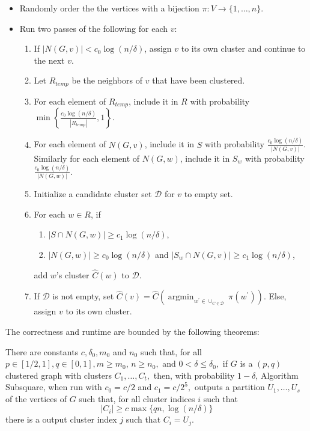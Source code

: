 {	\begin{itemize}
		\item Randomly order the the vertices with a bijection $\pi : V \rightarrow \{1, \ldots, n\}$.
		\item Run two passes of the following for each $v$:
		\begin{enumerate}
			\item If $|N(G,v)|<c_0 \log(n/\delta)$, assign $v$ to its own cluster and continue to the next $v$.
			\item Let $R_{temp}$ be the neighbors of $v$ that have been clustered.
			\item For each element of $R_{temp}$, include it in $R$ with probability $\min \left\{\frac{c_{0} \log (n / \delta)}{\left|R_{t e m p}\right|}, 1\right\}$.
			\item For each element of $N(G,v)$, include it in $S$ with probability $\frac{c_{0} \log (n / \delta)}{|N(G, v)|}$. Similarly for each element of $N(G,w)$, include it in $S_w$ with probability $\frac{c_{0} \log (n / \delta)}{|N(G, w)|}$.
			\item Initialize a candidate cluster set $\mathcal{D}$ for $v$ to empty set.
			\item For each $w \in R$, if
				\begin{enumerate}
					\item $|S \cap N(G, w)| \geq c_{1} \log (n / \delta)$,
					\item $|N(G, w)| \geq c_{0} \log (n / \delta)$ and $\left|S_{w} \cap N(G, v)\right| \geq c_{1} \log (n / \delta)$,
				\end{enumerate}
				add $w$'s cluster $\hat{C}(w)$ to $\mathcal{D}$.
			\item If $\mathcal{D}$ is not empty, set $\hat{C}(v)=\hat{C}\left(\operatorname{argmin}_{w^{\prime} \in \cup_{C \in \mathcal{D}}} \pi\left(w^{\prime}\right)\right)$. Else, assign $v$ to its own cluster.
		\end{enumerate}
	\end{itemize}
	
	The correctness and runtime are bounded by the following theorems:
	
	\begin{theorem}
		There are constants $c, \delta_{0}, m_{0}$ and $n_{0}$ such that, for all $p \in[1 / 2,1], q \in[0,1], m \geq m_{0}$, $n \geq n_{0},$ and $0<\delta \leq \delta_{0},$ if $G$ is a $(p, q)$ clustered graph with clusters $C_{1}, \ldots, C_{t},$ then, with probability $1-\delta$, Algorithm Subsquare, when run with $c_{0}=c / 2$ and $c_{1}=c / 2^{5},$ outputs a partition $U_{1}, \ldots, U_{s}$ of the vertices of $G$ such that, for all cluster indices $i$ such that
			\begin{equation}\label{eq:bsh10-eq1}
				\left|C_{i}\right| \geq c \max \{q n, \log (n / \delta)\}
			\end{equation}
			there is a output cluster index $j$ such that $C_{i}=U_{j}$.
	\end{theorem}
	
}
